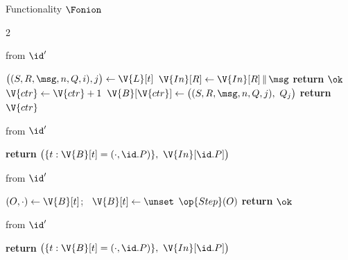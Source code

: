 \begin{interface}[nofloat]{Functionality $\Fonion$ \\
}
{\begin{multicols}{2}
\columnbreak

 \quad from $\id'$
\begin{algorithmic}[1]
\algcont
{} \label{ln:oradvdecides}
\State $\bigl((S, R, \msg, n, Q, i), j\bigr) \gets \V{L}[t]$ \label{ln:ornoremove}
  \If{$\msg \neq \none$}
    \State $\V{In}[R] \gets \V{In}[R] \,\|\, \msg$ \label{ln:orarrive}
  \EndIf
  \State \textbf{return} $\ok$
\EndIf
\State $\V{ctr} \gets \V{ctr} + 1$
\State $\V{B}[\V{ctr}] \gets \bigl((S, R, \msg, n, Q, j),\ Q_j\bigr)$ \label{ln:orhandover}
\State \textbf{return} $\V{ctr}$
\algsave
\end{algorithmic}
\vspace{1.4ex}

 \quad from $\id'$
\begin{algorithmic}[1]
\algcont
\State \textbf{return} $\bigl(\{t : \V{B}[t] = (\cdot, \id.P)\},\ \V{In}[\id.P]\bigr)$ \label{ln:orpoll}
\algsave
\end{algorithmic}
\vspace{1.4ex}

 \quad from $\id'$
\begin{algorithmic}[1]
\algcont
{} \label{ln:orowner}
\State $(O, \cdot) \gets \V{B}[t]$; \ $\V{B}[t] \gets \unset$ \label{ln:orbufdrop}
\State $\op{Step}(O)$
\State \textbf{return} $\ok$
\algsave
\end{algorithmic}
\vspace{1.4ex}

 \quad from $\id'$
\begin{algorithmic}[1]
\algcont
\State \textbf{return} $\bigl(\{t : \V{B}[t] = (\cdot, \id.P)\},\ \V{In}[\id.P]\bigr)$ \label{ln:orleak}
\algsave
\end{algorithmic}
\end{multicols}}
\end{interface}
